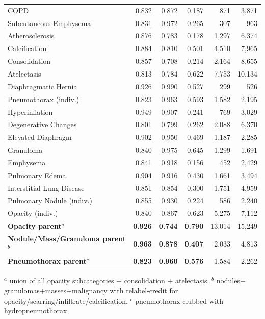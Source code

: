 \documentclass[11pt,a4paper]{article}
\begin{document}
\begin{longtable}{p{5.2cm} r r r r r}
COPD & 0.832 & 0.872 & 0.187 & 871 & 3{,}871 \\
Subcutaneous Emphysema & 0.831 & 0.972 & 0.265 & 307 & 963 \\
Atherosclerosis & 0.876 & 0.783 & 0.178 & 1{,}297 & 6{,}374 \\
Calcification & 0.884 & 0.810 & 0.501 & 4{,}510 & 7{,}965 \\
Consolidation & 0.857 & 0.708 & 0.214 & 2{,}164 & 8{,}655 \\
Atelectasis & 0.813 & 0.784 & 0.622 & 7{,}753 & 10{,}134 \\
Diaphragmatic Hernia & 0.926 & 0.990 & 0.527 & 299 & 526 \\
Pneumothorax (indiv.) & 0.823 & 0.963 & 0.593 & 1{,}582 & 2{,}195 \\
Hyperinflation & 0.949 & 0.907 & 0.241 & 769 & 3{,}029 \\
Degenerative Changes & 0.801 & 0.799 & 0.262 & 2{,}088 & 6{,}370 \\
Elevated Diaphragm & 0.902 & 0.950 & 0.469 & 1{,}187 & 2{,}285 \\
Granuloma & 0.840 & 0.975 & 0.645 & 1{,}299 & 1{,}691 \\
Emphysema & 0.841 & 0.918 & 0.156 & 452 & 2{,}429 \\
Pulmonary Edema & 0.904 & 0.916 & 0.430 & 1{,}661 & 3{,}494 \\
Interstitial Lung Disease & 0.851 & 0.854 & 0.300 & 1{,}751 & 4{,}959 \\
Pulmonary Nodule (indiv.) & 0.855 & 0.930 & 0.224 & 586 & 2{,}240 \\
Opacity (indiv.) & 0.840 & 0.867 & 0.623 & 5{,}275 & 7{,}112 \\
\midrule
\textbf{Opacity parent}$^{a}$ & \textbf{0.926} & \textbf{0.744} & \textbf{0.790} & 13{,}014 & 15{,}249 \\
\textbf{Nodule/Mass/Granuloma parent}$^{b}$ & \textbf{0.963} & \textbf{0.878} & \textbf{0.407} & 2{,}033 & 4{,}813 \\
\textbf{Pneumothorax parent}$^{c}$ & \textbf{0.823} & \textbf{0.960} & \textbf{0.576} & 1{,}584 & 2{,}262 \\
\end{longtable}
\vspace{-1.0em}
{\footnotesize $^{a}$ union of all opacity subcategories $+$ consolidation $+$ atelectasis. $^{b}$ nodules$+$granulomas$+$masses$+$malignancy with relabel-credit for opacity/scarring/infiltrate/calcification. $^{c}$ pneumothorax clubbed with hydropneumothorax.}
\end{document}
